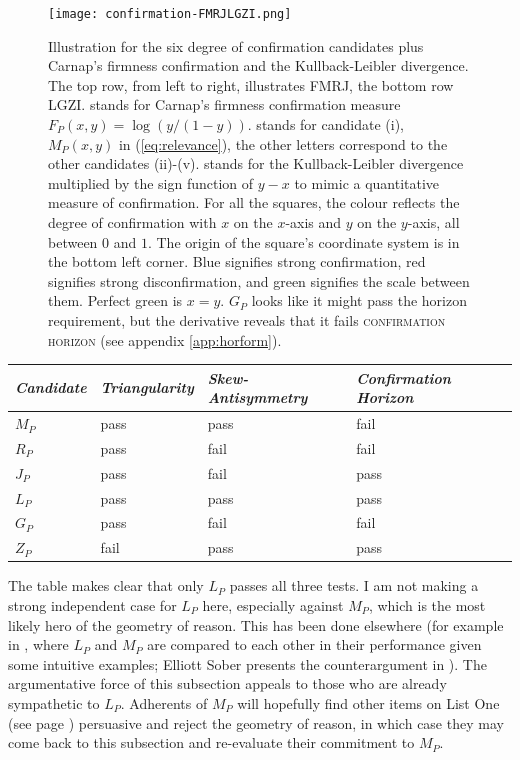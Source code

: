 \documentclass[phd,12pt,oneside]{ubcthesis}
\begin{document}
\begin{figure}[ht!]
    \begin{minipage}[h]{\linewidth}
      \texttt{[image: confirmation-FMRJLGZI.png]}
      \caption{\footnotesize Illustration for the six degree of
        confirmation candidates plus Carnap's firmness confirmation
        and the Kullback-Leibler divergence. The top row, from left to
        right, illustrates FMRJ, the bottom row LGZI.  stands
        for Carnap's firmness confirmation measure
        $F_{P}(x,y)=\log(y/(1-y))$.  stands for candidate
        (i), $M_{P}(x,y)$ in (\ref{eq:relevance}), the other letters
        correspond to the other candidates (ii)-(v).  stands
        for the Kullback-Leibler divergence multiplied by the sign
        function of $y-x$ to mimic a quantitative measure of
        confirmation. For all the squares, the colour reflects the
        degree of confirmation with $x$ on the $x$-axis and $y$ on the
        $y$-axis, all between $0$ and $1$. The origin of the square's
        coordinate system is in the bottom left corner. Blue signifies
        strong confirmation, red signifies strong disconfirmation, and
        green signifies the scale between them. Perfect green is
        $x=y$. $G_{P}$ looks like it might pass the horizon
        requirement, but the derivative reveals that it fails
        \textsc{confirmation horizon} (see appendix
        \ref{app:horform}).}
      \label{fig:doconf}
\end{minipage}
\end{figure}

\begin{tabular}{|l|l|l|l|}\hline
  \emph{Candidate} & \emph{Triangularity} & \emph{Skew-Antisymmetry} & \emph{Confirmation Horizon} \\ \hline
  $M_{P}$ & pass & pass & fail \\ \hline
  $R_{P}$ & pass & fail & fail \\ \hline
  $J_{P}$ & pass & fail & pass \\ \hline
  $L_{P}$ & pass & pass & pass \\ \hline
  $G_{P}$ & pass & fail & fail \\ \hline
  $Z_{P}$ & fail & pass & pass \\ \hline
\end{tabular}

\medskip

The table makes clear that only $L_{P}$ passes all three tests. I am
not making a strong independent case for $L_{P}$ here, especially
against $M_{P}$, which is the most likely hero of the geometry of
reason. This has been done elsewhere (for example in
, where $L_{P}$ and $M_{P}$ are compared to
each other in their performance given some intuitive examples; Elliott
Sober presents the counterargument in ). The
argumentative force of this subsection appeals to those who are
already sympathetic to $L_{P}$. Adherents of $M_{P}$ will hopefully
find other items on List One (see page \pageref{page:listone})
persuasive and reject the geometry of reason, in which case they may
come back to this subsection and re-evaluate their commitment to
$M_{P}$.
\end{document}

